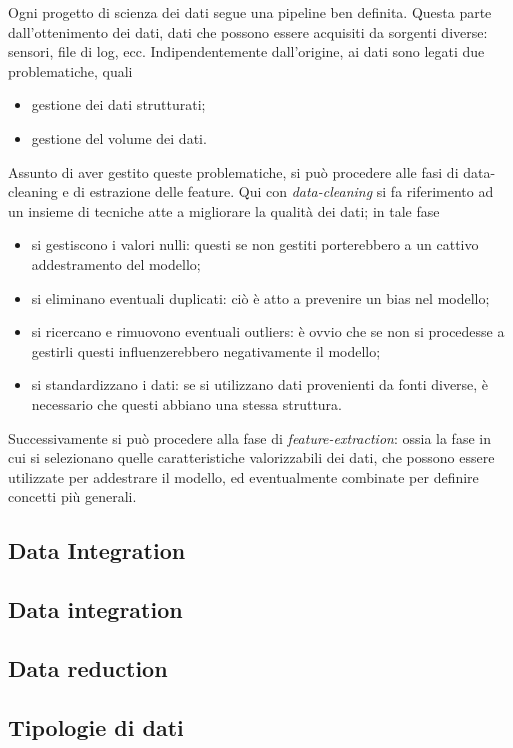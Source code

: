 \documentclass{subfiles}
\begin{document}
Ogni progetto di scienza dei dati segue una pipeline ben definita.
Questa parte dall'ottenimento dei dati, dati che possono essere acquisiti da sorgenti diverse: sensori, file di log, ecc.
Indipendentemente dall'origine, ai dati sono legati due problematiche, quali
\begin{itemize}
    \item gestione dei dati strutturati;
    \item gestione del volume dei dati.
\end{itemize}
Assunto di aver gestito queste problematiche, si può procedere alle fasi di data-cleaning e di estrazione delle feature.
Qui con \emph{data-cleaning} si fa riferimento ad un insieme di tecniche atte a migliorare la qualità dei dati; in tale fase
\begin{itemize}
    \item si gestiscono i valori nulli: questi se non gestiti porterebbero a un cattivo addestramento del modello;
    \item si eliminano eventuali duplicati: ciò è atto a prevenire un bias nel modello;
    \item si ricercano e rimuovono eventuali outliers: è ovvio che se non si procedesse a gestirli questi influenzerebbero negativamente il modello;
    \item si standardizzano i dati: se si utilizzano dati provenienti da fonti diverse, è necessario che questi abbiano una stessa struttura.
\end{itemize}
Successivamente si può procedere alla fase di \emph{feature-extraction}: ossia la fase in cui si selezionano quelle caratteristiche valorizzabili dei dati,
che possono essere utilizzate per addestrare il modello, ed eventualmente combinate per definire concetti più generali.

\subsection{Data Integration}


\subsection{Data integration}


\subsection{Data reduction}


\subsection{Tipologie di dati}

\end{document}
